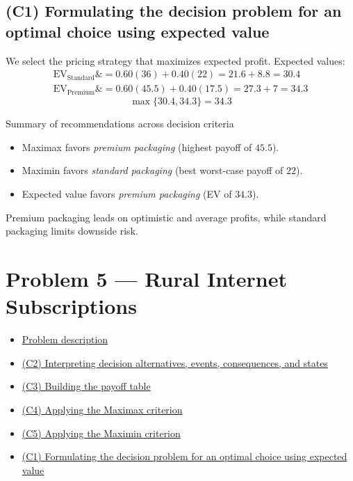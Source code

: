 \documentclass[11pt]{article}
\begin{document}
	\subsection*{(C1) Formulating the decision problem for an optimal choice using expected value}
	
	\hypertarget{problem4-c1}{}
	
	We select the pricing strategy that maximizes expected profit. Expected values:
	\[
	\begin{aligned}
		\mathrm{EV}_{\text{Standard}} \&= 0.60(36) + 0.40(22) = 21.6 + 8.8 = 30.4 \\
		\mathrm{EV}_{\text{Premium}} \&= 0.60(45.5) + 0.40(17.5) = 27.3 + 7 = 34.3
	\end{aligned}
	\]
	\[
	\max\{30.4, 34.3\} = 34.3
	\]
	
	Summary of recommendations across decision criteria
	\begin{itemize}
		\item Maximax favors \emph{premium packaging} (highest payoff of $45.5$).
		\item Maximin favors \emph{standard packaging} (best worst-case payoff of $22$).
		\item Expected value favors \emph{premium packaging} (EV of $34.3$).
	\end{itemize}
	
	Premium packaging leads on optimistic and average profits, while standard packaging limits downside risk.
	
	\section*{Problem 5 — Rural Internet Subscriptions}
	
	\hypertarget{problem5}{}
	
	\hypertarget{problem5-criteria}{}
	
	\begin{itemize}
		\item \hyperlink{problem5-problem}{Problem description}
		\item \hyperlink{problem5-c2}{(C2) Interpreting decision alternatives, events, consequences, and states}
		\item \hyperlink{problem5-c3}{(C3) Building the payoff table}
		\item \hyperlink{problem5-c4}{(C4) Applying the Maximax criterion}
		\item \hyperlink{problem5-c5}{(C5) Applying the Maximin criterion}
		\item \hyperlink{problem5-c1}{(C1) Formulating the decision problem for an optimal choice using expected value}
	\end{itemize}
	
\end{document}
